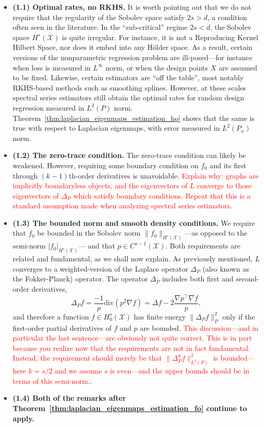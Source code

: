 \documentclass{article}
\newcommand{\1}{\mathbf{1}}
\newcommand{\Leb}{L}
\newcommand{\mc}[1]{\mathcal{#1}}
\theoremstyle{alden}
\theoremstyle{aldenthm}
\theoremstyle{definition}
\theoremstyle{remark}
\begin{document}
\begin{itemize}
	\item \textbf{(1.1) Optimal rates, no RKHS.} It is worth pointing out that we do not require that the regularity of the Sobolev space satisfy $2s > d$, a condition often seen in the literature. In the ``sub-critical'' regime $2s < d$, the Sobolev space $H^s(\mc{X})$ is quite irregular. For instance, it is not a Reproducing Kernel Hilbert Space, nor does it embed into any H\"{o}lder space. As a result, certain versions of the nonparametric regression problem are ill-posed---for instance when loss is measured in $\Leb^{\infty}$ norm, or when the design points $X$ are assumed to be fixed. Likewise, certain estimators are ``off the table'', most notably RKHS-based methods such as smoothing splines. However, at these scales spectral series estimators still obtain the optimal rates for random design regression measured in $\Leb^2(P)$ norm. Theorem~\ref{thm:laplacian_eigenmaps_estimation_ho} shows that the same is true with respect to Laplacian eigenmaps, with error measured in $\Leb^2(P_n)$ norm.
	\item \textbf{(1.2) The zero-trace condition.} The zero-trace condition can likely be weakened. However, requiring some boundary condition on $f_0$ and its first through $(k -1 )$th-order derivatives is unavoidable. \textcolor{red}{Explain why: graphs are implicitly boundaryless objects, and the eigenvectors of $L$ converge to those eigenvectors of $\Delta_P$ which satisfy boundary conditions. Repeat that this is a standard assumption made when analyzing spectral series estimators}.
	\item \textbf{(1.3) The bounded norm and smooth density conditions.} We require that $f_0$ be bounded in the Sobolev norm $\|f_0\|_{H^s(\mc{X})}$---as opposed to the semi-norm $|f_0|_{H^s(\mc{X})}$--- and that $p \in C^{s - 1}(\mc{X})$. Both requirements are related and fundamental, as we shall now explain. As previously mentioned, $L$ converges to a weighted-version of the Laplace operator $\Delta_P$ (also known as the Fokker-Planck) operator. The operator $\Delta_P$ includes both first and second-order derivatives,
	\begin{equation}
	\label{eqn:fokker_planck_1}
	\Delta_Pf= \frac{-1}{p} \mathrm{div}(p^2 \nabla f) = \Delta f - 2\frac{\nabla p^{\top} \nabla f}{p},
	\end{equation}
	and therefore a function $f \in H_0^s(\mc{X})$ has finite energy $\|\Delta_P f\|_{P}^2$ only if the first-order partial derivatives of $f$ and $p$ are bounded. \textcolor{red}{This discussion---and in particular the last sentence---are obviously not quite correct. This is in part because you realize now that the requirements are not in fact fundamental. Instead, the requirement should merely be that $\|\Delta_P^kf\|_{\Leb^2(P)}^2$ is bounded---here $k = s/2$ and we assume $s$ is even---and the upper bounds should be in terms of this semi-norm.}.
	\item \textbf{(1.4) Both of the remarks after Theorem~\ref{thm:laplacian_eigenmaps_estimation_fo} continue to apply.}
\end{itemize}
\end{document}
